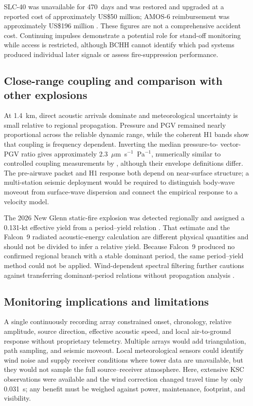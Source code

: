 \documentclass[]{seismica}
\begin{document}
SLC-40 was unavailable for 470~days and was restored and upgraded at a reported
cost of approximately US\$50 million; AMOS-6 reimbursement was approximately
US\$196 million \citep{clark_slc40_2017,magan_amos6_2016,
spacex_crs13_2017}. These figures are not a comprehensive accident cost.
Continuing impulses demonstrate a potential role for stand-off monitoring
while access is restricted, although BCHH cannot identify which pad systems
produced individual later signals or assess fire-suppression performance.

\subsection{Close-range coupling and comparison with other explosions}

At 1.4~km, direct acoustic arrivals dominate and meteorological uncertainty is
small relative to regional propagation. Pressure and PGV remained nearly
proportional across the reliable dynamic range, while the coherent H1 bands
show that coupling is frequency dependent. Inverting the median pressure-to-
vector-PGV ratio gives approximately
2.3~$\mu$m~s$^{-1}$~Pa$^{-1}$, numerically similar to controlled coupling
measurements by \citet{novoselov_ground_coupling_2020}, although their envelope
definitions differ. The pre-airwave packet and H1 response both depend on
near-surface structure; a multi-station seismic deployment would be required
to distinguish body-wave moveout from surface-wave dispersion and connect the
empirical response to a velocity model.

The 2026 New Glenn static-fire explosion was detected regionally and assigned
a 0.131-kt effective yield from a period--yield relation
\citep{silber_scamfer_newglenn_2026}. That estimate and the Falcon~9 radiated
acoustic-energy calculation are different physical quantities and should not
be divided to infer a relative yield. Because Falcon~9 produced no confirmed
regional branch with a stable dominant period, the same period--yield method
could not be applied. Wind-dependent spectral filtering further cautions
against transferring dominant-period relations without propagation analysis
\citep{silber_wind_filtering_2026}.

\subsection{Monitoring implications and limitations}

A single continuously recording array constrained onset, chronology, relative
amplitude, source direction, effective acoustic speed, and local air-to-ground
response without proprietary telemetry. Multiple arrays would add
triangulation, path sampling, and seismic moveout. Local meteorological sensors
could identify wind noise and supply receiver conditions where tower data are
unavailable, but they would not sample the full source--receiver atmosphere.
Here, extensive KSC observations were available and the wind correction changed
travel time by only 0.031~s; any benefit must be weighed against power,
maintenance, footprint, and visibility.
\end{document}
